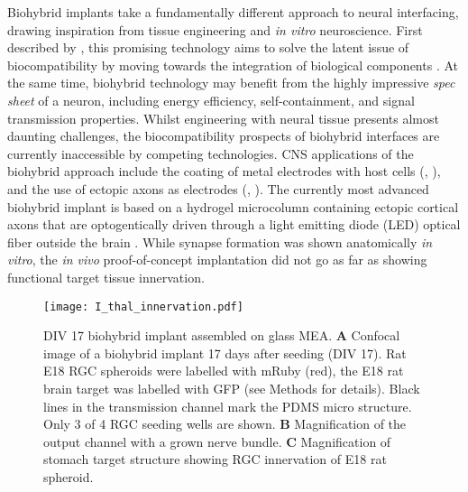 Biohybrid implants take a fundamentally different approach to neural
interfacing, drawing inspiration from tissue engineering and \textit{in vitro}
neuroscience. First described by \cite{biohybridfirst}, this promising
technology aims to solve the latent issue of biocompatibility by moving towards
the integration of biological components \parencite{biohybridreview}. At the
same time, biohybrid technology may benefit from the highly impressive
\textit{spec sheet} of a neuron, including energy efficiency, self-containment,
and signal transmission properties. Whilst engineering with neural tissue
presents almost daunting challenges, the biocompatibility prospects of biohybrid
interfaces are currently inaccessible by competing technologies. CNS
applications of the biohybrid approach include the coating of metal electrodes
with host cells (\cite{seededelectrodes1}, \cite{seededelectrodes2}), and the
use of ectopic axons as electrodes (\cite{filmbasedinterface},
\cite{cullenrecent}). The currently most advanced biohybrid implant is based on
a hydrogel microcolumn containing ectopic cortical axons that are optogentically
driven through a light emitting diode (LED) optical fiber outside the brain
\parencite{cullenrecent}. While synapse formation was shown anatomically
\textit{in vitro}, the \textit{in vivo} proof-of-concept implantation did not go
as far as showing functional target tissue innervation. \\

\begin{figure}[h!]
    \texttt{[image: I\_thal\_innervation.pdf]}
    \caption[DIV 17 biohybrid implant assembled on glass MEA]{DIV 17 biohybrid
        implant assembled on glass MEA. \textbf{A} Confocal image of a biohybrid
        implant 17 days after seeding (DIV 17). Rat E18 RGC spheroids were
        labelled with mRuby (red), the E18 rat brain target was labelled with
        GFP (see Methods for details). Black lines in the transmission channel
        mark the PDMS micro structure. Only 3 of 4 RGC seeding wells are
        shown. \textbf{B} Magnification of the output channel with a grown nerve
        bundle. \textbf{C} Magnification of stomach target structure showing RGC
        innervation of E18 rat spheroid.}  
    \label{I_thal_innervation}
\end{figure}

